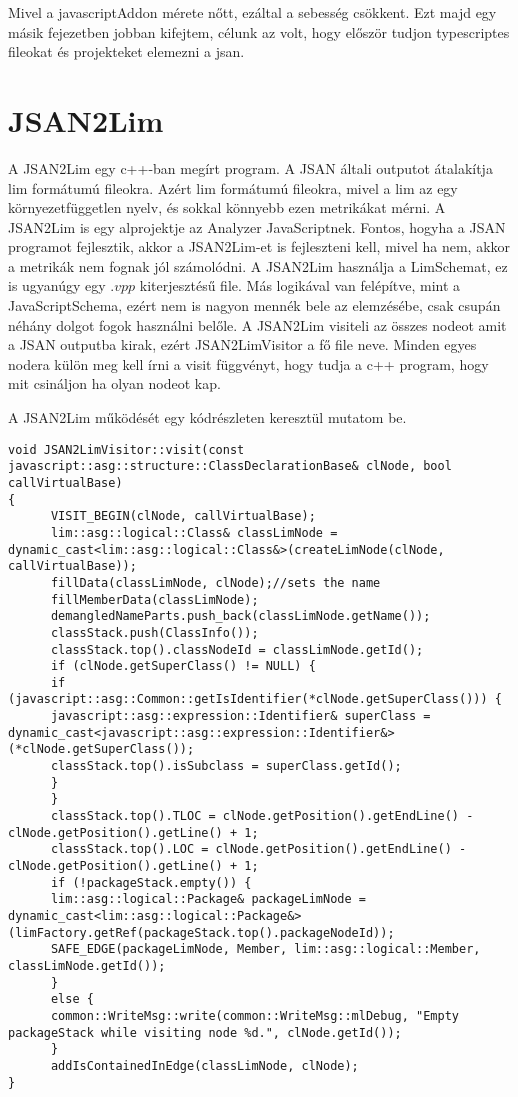 \noindent

Mivel a javascriptAddon mérete nőtt, ezáltal a sebesség csökkent.
Ezt majd egy másik fejezetben jobban kifejtem, célunk az volt, hogy először tudjon typescriptes fileokat és projekteket elemezni a jsan.


\section{JSAN2Lim}

\noindent

A JSAN2Lim egy c++-ban megírt program. A JSAN általi outputot átalakítja lim formátumú fileokra.
Azért lim formátumú fileokra, mivel a lim az egy környezetfüggetlen nyelv, és sokkal könnyebb ezen metrikákat mérni.
A JSAN2Lim is egy alprojektje az Analyzer JavaScriptnek.
Fontos, hogyha a JSAN programot fejlesztik, akkor a JSAN2Lim-et is fejleszteni kell, mivel ha nem, akkor a metrikák nem fognak jól számolódni.
A JSAN2Lim használja a LimSchemat, ez is ugyanúgy egy $.vpp$ kiterjesztésű file.
Más logikával van felépítve, mint a JavaScriptSchema, ezért nem is nagyon mennék bele az elemzésébe, csak csupán néhány dolgot fogok használni belőle.
A JSAN2Lim visiteli az összes nodeot amit a JSAN outputba kirak, ezért JSAN2LimVisitor a fő file neve.
Minden egyes nodera külön meg kell írni a visit függvényt, hogy tudja a c++ program, hogy mit csináljon ha olyan nodeot kap.

\noindent

A JSAN2Lim működését egy kódrészleten keresztül mutatom be.
\begin{lstlisting}[caption={ClassDeclaration Visitor}, label={lst:classdeclaration_visitor}, language={CStyle}]
void JSAN2LimVisitor::visit(const javascript::asg::structure::ClassDeclarationBase& clNode, bool callVirtualBase)
{
      VISIT_BEGIN(clNode, callVirtualBase);
      lim::asg::logical::Class& classLimNode = dynamic_cast<lim::asg::logical::Class&>(createLimNode(clNode, callVirtualBase));
      fillData(classLimNode, clNode);//sets the name
      fillMemberData(classLimNode);
      demangledNameParts.push_back(classLimNode.getName());
      classStack.push(ClassInfo());
      classStack.top().classNodeId = classLimNode.getId();
      if (clNode.getSuperClass() != NULL) {
      if (javascript::asg::Common::getIsIdentifier(*clNode.getSuperClass())) {
      javascript::asg::expression::Identifier& superClass = dynamic_cast<javascript::asg::expression::Identifier&>(*clNode.getSuperClass());
      classStack.top().isSubclass = superClass.getId();
      }
      }
      classStack.top().TLOC = clNode.getPosition().getEndLine() - clNode.getPosition().getLine() + 1;
      classStack.top().LOC = clNode.getPosition().getEndLine() - clNode.getPosition().getLine() + 1;
      if (!packageStack.empty()) {
      lim::asg::logical::Package& packageLimNode = dynamic_cast<lim::asg::logical::Package&>(limFactory.getRef(packageStack.top().packageNodeId));
      SAFE_EDGE(packageLimNode, Member, lim::asg::logical::Member, classLimNode.getId());
      }
      else {
      common::WriteMsg::write(common::WriteMsg::mlDebug, "Empty packageStack while visiting node %d.", clNode.getId());
      }
      addIsContainedInEdge(classLimNode, clNode);
}
\end{lstlisting}

